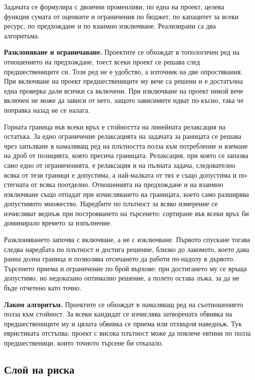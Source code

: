 Задачата се формулира с двоични променливи, по една на проект, целева функция
сумата от оценките и ограничения по бюджет, по капацитет за всеки ресурс, по
предхождане и по взаимно изключване. Реализирани са два алгоритъма.

\textbf{Разклоняване и ограничаване.} Проектите се обхождат в топологичен ред на
отношението на предхождане, тоест всеки проект се решава след предшествениците
си. Този ред не е удобство, а източник на две опростявания. При включване на
проект предшествениците му вече са решени и е достатъчна една проверка дали
всички са включени. При изключване на проект никой вече включен не може да зависи
от него, защото зависимите идват по-късно, така че поправка назад не се налага.

Горната граница във всеки връх е стойността на линейната релаксация на остатъка.
За едно ограничение релаксацията на задачата за раницата се решава чрез запълване
в намаляващ ред на плътността полза към потребление и вземане на дроб от
позицията, която пресича границата. Релаксация, при която се запазва само едно от
ограниченията, е релаксация и на пълната задача, следователно всяка от тези
граници е допустима, а най-малката от тях е също допустима и по-стегната от всяка
поотделно. Отношенията на предхождане и на взаимно изключване също отпадат при
изчисляването на границата, което само разширява допустимото множество.
Наредбите по плътност за всяко измерение се изчисляват веднъж при построяването
на търсенето: сортиране във всеки връх би доминирало времето за изпълнение.

Разклоняването започва с включване, а не с изключване. Първото спускане тогава
следва наредбата по плътност и достига решение, близко до лакомото, което дава
ранна долна граница и позволява отсичането да работи по-надолу в дървото.
Търсенето приема и ограничение по брой върхове; при достигането му се връща
допустимо, но недоказано оптимално решение, а полето  остава лъжа,
за да не бъде отчетено като точно.

\textbf{Лаком алгоритъм.} Проектите се обхождат в намаляващ ред на съотношението
полза към стойност. За всеки кандидат се изчислява затворената обвивка на
предшествениците му и цялата обвивка се приема или отхвърля наведнъж. Тук
евристиката отстъпва: проект с висока плътност може да повлече евтини по полза
предшественици, които точното търсене би отказало.

\subsection{Слой на риска}

